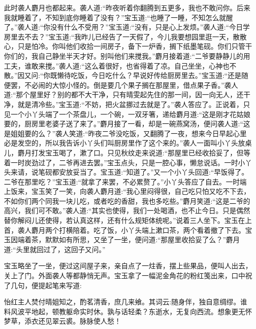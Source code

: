 \begin{parag}
    此时袭人麝月也都起来。袭人道:“昨夜听着你翻腾到五更多，我也不敢问你。后来我就睡着了，不知到底你睡着了没有？”宝玉道:“也睡了一睡，不知怎么就醒了。”袭人道:“你没有什么不受用？”宝玉道:“没有，只是心上发烦。”袭人道:“今日学房里去不去？”宝玉道:“我昨儿已经告了一天假了，今儿我要想园里逛一天，散散心，只是怕冷。你叫他们收拾一间房子，备下一炉香，搁下纸墨笔砚。你们只管干你们的，我自己静坐半天才好。别叫他们来搅我。”麝月接着道:“二爷要静静儿的用工夫，谁敢来搅。”袭人道:“这么着很好，也省得着了凉。自己坐坐，心神也不散。”因又问:“你既懒待吃饭，今日吃什么？早说好传给厨房里去。”宝玉道:“还是随便罢，不必闹的大惊小怪的。倒是要几个果子搁在那屋里，借点果子香。”袭人道:“那个屋里好？别的都不大干净，只有晴雯起先住的那一间，因一向无人，还干净，就是清冷些。”宝玉道:“不妨，把火盆挪过去就是了。”袭人答应了。正说着，只见一个小丫头端了一个茶盘儿，一个碗，一双牙箸，递给麝月道:“这是刚才花姑娘要的，厨房里老婆子送了来了。”麝月接了一看，却是一碗燕窝汤，便问袭人道:“这是姐姐要的么？”袭人笑道:“昨夜二爷没吃饭，又翻腾了一夜，想来今日早起心里必是发空的，所以我告诉小丫头们叫厨房里作了这个来的。”袭人一面叫小丫头放桌儿，麝月打发宝玉喝了，漱了口。只见秋纹走来说道:“那屋里已经收拾妥了，但等着一时炭劲过了，二爷再进去罢。”宝玉点头，只是一腔心事，懒怠说话。一时小丫头来请，说笔砚都安放妥当了。宝玉道:“知道了。”又一个小丫头回道:“早饭得了。二爷在那里吃？”宝玉道:“就拿了来罢，不必累赘了。”小丫头答应了自去。一时端上饭来，宝玉笑了一笑，向袭人麝月道:“我心里闷得很，自己吃只怕又吃不下去，不如你们两个同我一块儿吃，或者吃的香甜，我也多吃些。”麝月笑道:“这是二爷的高兴，我们可不敢。”袭人道:“其实也使得，我们一处喝酒，也不止今日。只是偶然替你解闷儿还使得，若认真这样，还有什么规矩体统呢。”说着三人坐下。宝玉在上首，袭人麝月两个打横陪着。吃了饭，小丫头端上漱口茶，两个看着撤了下去。宝玉因端着茶，默默如有所思，又坐了一坐，便问道:“那屋里收拾妥了么？”麝月道:“头里就回过了，这回子又问。”
\end{parag}


\begin{parag}
    宝玉略坐了一坐，便过这间屋子来，亲自点了一炷香，摆上些果品，便叫人出去，关上了门。外面袭人等都静悄无声。宝玉拿了一幅泥金角花的粉红笺出来，口中祝了几句，便提起笔来写道:
\end{parag}


\begin{qute2sp}
    怡红主人焚付晴姐知之，酌茗清香，庶几来飨。其词云:随身伴，独自意绸缪。谁料风波平地起，顿教躯命实时休。孰与话轻柔？东逝水，无复向西流。想象更无怀梦草，添衣还见翠云裘。脉脉使人愁！
\end{qute2sp}



